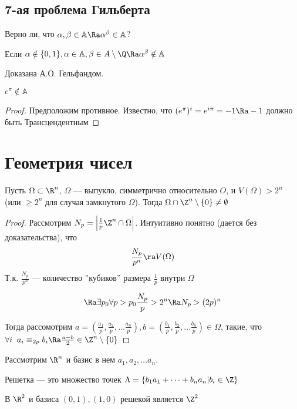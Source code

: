 
\subsection{7-ая проблема Гильберта}
\begin{problem}
    Верно ли, что \(\alpha, \beta \in \mathbb{A} \Ra \alpha^\beta \in \mathbb{A}\)?
\end{problem}

\begin{theorem}
    Если \(\alpha \notin \{0, 1\}, \alpha \in \mathbb{A}, \beta \in A \setminus \Q \Ra \alpha^\beta \notin \mathbb{A}\)
\end{theorem}
Доказана А.О. Гельфандом.

\begin{proposition}
    \(e^\pi \notin \mathbb{A}\)
\end{proposition}
\begin{proof}
    Предположим противное. Известно, что \((e^\pi)^i = e^{i\pi} = -1 \Ra -1\) должно быть Трансцендентным
\end{proof}

\section{Геометрия чисел}
\begin{theorem}[Минковского]
    Пусть \(\Omega \subset \R^n\), \(\Omega\) --- выпукло, симметрично относительно \(O\), и \(V(\Omega) > 2^n\) (или \(\ge 2^n\) для случая замкнутого \(\Omega\)). Тогда \(\Omega \cap \Z^n \setminus \{0\} \ne \emptyset\)
\end{theorem}
\begin{proof}
    Рассмотрим \(N_p = \left|\frac{1}{p}\Z^n\cap \Omega\right|\). Интуитивно понятно (дается без доказательства), что 
    \[\frac{N_p}{p^n} \ra V(\Omega)\]
    Т.к. \(\frac{N_p}{p^n}\) --- количество ''кубиков'' размера \(\frac{1}{p}\) внутри \(\Omega\)

    \[\Ra \exists p_0 \forall p > p_0 \frac{N_p}{p} > 2^n \Ra N_p > (2p)^n\]

    Тогда рассомотрим \(a = \left(\frac{a_1}{p}, \frac{a_2}{p}, \dots \frac{a_n}{p}\right), b = \left(\frac{b_1}{p}, \frac{b_2}{p}, \dots \frac{b_n}{p}\right) \in \Omega\), такие, что \(\forall i\;\;a_i \equiv_{2p} b_i \Ra \frac{a - b}{2} \in \Z^n \setminus \{0\}\)
\end{proof}

Рассмотрим \(\R^n\) и базис в нем \(a_1, a_2, \dots a_n\). 
\begin{definition}
    Решетка --- это множество точек \(\Lambda = \{b_1a_1 + \dots + b_na_n | b_i \in \Z\}\)
\end{definition}
\begin{example}
    В \(\R^2\) и базиса \((0, 1), (1, 0)\) решекой является \(\Z^2\)
\end{example}

